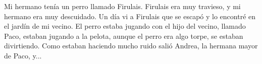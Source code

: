 \documentclass{article}
\begin{document}
Mi hermano tenía un perro llamado Firulais. Firulais era muy travieso, y mi hermano era muy descuidado. Un día vi a Firulais que se escapó y lo encontré en el jardín de mi vecino.
El perro estaba jugando con el hijo del vecino, llamado Paco, estaban jugando a la pelota, aunque el perro era algo torpe, se estaban divirtiendo. Como estaban haciendo mucho ruido salió Andrea, la hermana mayor de Paco, y...
\end{document}
